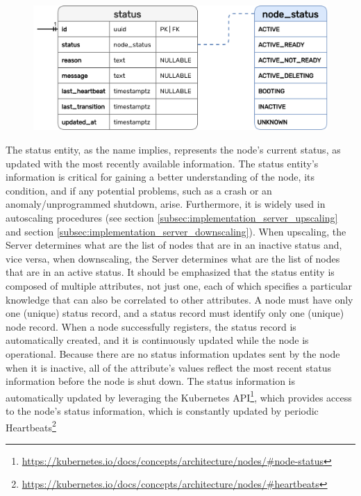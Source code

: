 \begin{figure}
  \centering
  \includegraphics[width=\linewidth]{images/implementation/erm_status.png}
\end{figure}

The status entity, as the name implies, represents the node's current status, as
updated with the most recently available information.
\newline
The status entity's information is critical for gaining a better understanding
of the node, its condition, and if any potential problems, such as a crash or an
anomaly/unprogrammed shutdown, arise. Furthermore, it is widely used in
autoscaling procedures (see section \ref{subsec:implementation_server_upscaling}
and section \ref{subsec:implementation_server_downscaling}). When upscaling, the
Server determines what are the list of nodes that are in an inactive status and,
vice versa, when downscaling, the Server determines what are the list of nodes that
are in an active status. It should be emphasized that the status entity is
composed of multiple attributes, not just one, each of which specifies a
particular knowledge that can also be correlated to other attributes.
\newline
A node must have only one (unique) status record, and a status record must
identify only one (unique) node record. When a node successfully registers, the
status record is automatically created, and it is continuously updated while the
node is operational. Because there are no status information updates sent by the
node when it is inactive, all of the attribute's values reflect the most recent status
information before the node is shut down.
\newline
The status information is automatically updated by leveraging the Kubernetes API\footnote{\url{https://kubernetes.io/docs/concepts/architecture/nodes/\#node-status}},
which provides access to the node's status information, which is constantly
updated by periodic Heartbeats\footnote{\url{https://kubernetes.io/docs/concepts/architecture/nodes/\#heartbeats}}
